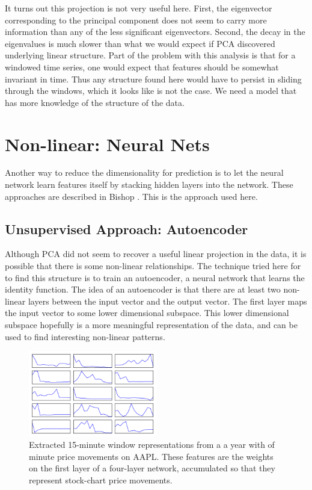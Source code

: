 \documentclass{article}
\begin{document}
It turns out this projection is not
very useful here. First, the eigenvector corresponding to the
principal component does not seem to carry more information
than any of the less significant eigenvectors. Second, the
decay in the eigenvalues is much slower than what we would
expect if PCA discovered underlying linear structure. Part of
the problem with this analysis is that for a windowed time series,
one would expect that features should be somewhat invariant in
time. Thus any structure found here would have to persist in sliding
through the windows, which it looks like is not the case. We need
a model that has more knowledge of the structure of the data. 

\section{Non-linear: Neural Nets}

Another way to reduce the dimensionality for prediction is to let the
neural network learn features itself by stacking hidden layers into the network.
These approaches are described in Bishop \cite{bishop1995neural}.
This is the approach used here. 

\subsection{Unsupervised Approach: Autoencoder}

Although PCA did not seem to recover a useful linear projection in the 
data, it is possible that there is some non-linear relationships. 
The technique tried here for to find this structure is to
train an autoencoder, a neural network that learns the identity function.
The idea of an autoencoder is that there are at least two non-linear layers
between the input vector and the output vector. The first layer maps the
input vector to some lower dimensional subspace. This lower dimensional
subspace hopefully is a more meaningful representation of the data, and
can be used to find interesting non-linear patterns. 

\begin{figure}[h]
    \includegraphics[width=0.5\textwidth]{autoencoder_features}
    \caption{Extracted 15-minute window representations from a a year with of
    minute price movements on AAPL. These features are the weights on the first layer
    of a four-layer network, accumulated so that they represent stock-chart price
    movements.}
    \label{fig:autoencoder_features}
\end{figure}
\end{document}
